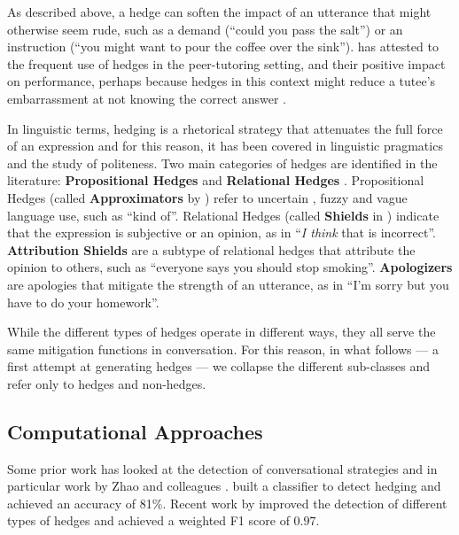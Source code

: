 \documentclass[11pt]{article}
\begin{document}

As described above, a hedge can soften the impact of an utterance that might otherwise seem rude, such as a demand (``could you pass the salt'') or an instruction (``you might want to pour the coffee over the sink''). \citet{madaio2017impact} has attested to the frequent use of hedges in the peer-tutoring setting, and their positive impact on performance, perhaps because hedges in this context might reduce a tutee's embarrassment at not knowing the correct answer \citep{rowland2007a}. 

In linguistic terms, hedging is a rhetorical strategy that attenuates the full force of an expression \citep{fraser2010a} and for this reason, it has been covered in linguistic pragmatics and the study of politeness. Two main categories of hedges are identified in the literature: \textbf{Propositional Hedges} and \textbf{Relational Hedges} \citep{prince1982a}. Propositional Hedges (called \textbf{Approximators} by \citep{prince1982a}) refer to uncertain \citep{vincze2014uncertainty}, fuzzy \citep{lakoff1975hedges} and vague \citep{williamson2002vagueness} language use, such as ``kind of''. Relational Hedges (called \textbf{Shields} in \citet{prince1982a}) indicate that the expression is subjective or an opinion, as in ``\textit{I think} that is incorrect''. \textbf{Attribution Shields} are a subtype of relational hedges that attribute the opinion to others, such as ``everyone says you should stop smoking''. \textbf{Apologizers} \citep{raphalen-etal-2022-might} are apologies that mitigate the strength of an utterance, as in ``I'm sorry but you have to do your homework''. 

While the different types of hedges operate in different ways, they all serve the same mitigation functions in conversation. For this reason, in what follows --- a first attempt at generating hedges --- we collapse the different sub-classes and refer only to hedges and non-hedges. 

\subsection{Computational Approaches}


Some prior work has looked at the detection of conversational strategies and in particular work by Zhao and colleagues \citep{zhao2014towards, zhao2016a, zhao2016automatic}. \citet{madaio2017impact} built a classifier to detect hedging and achieved an accuracy of 81\%. Recent work by \citet{raphalen-etal-2022-might} improved the detection of different types of hedges and achieved a weighted F1 score of $0.97$.
\end{document}
